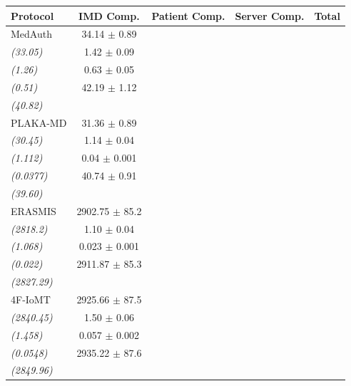 \begin{tabular}{l|c|c|c|c}
\toprule
\textbf{Protocol} & \textbf{IMD Comp.} & \textbf{Patient Comp.} & \textbf{Server Comp.} & \textbf{Total} \\
\midrule
MedAuth & 34.14 $\pm$ 0.89 \\ \textit{(33.05)} & 1.42 $\pm$ 0.09 \\ \textit{(1.26)} & 0.63 $\pm$ 0.05 \\ \textit{(0.51)} & 42.19 $\pm$ 1.12 \\ \textit{(40.82)} \\
PLAKA-MD & 31.36 $\pm$ 0.89 \\ \textit{(30.45)} & 1.14 $\pm$ 0.04 \\ \textit{(1.112)} & 0.04 $\pm$ 0.001 \\ \textit{(0.0377)} & 40.74 $\pm$ 0.91 \\ \textit{(39.60)} \\
ERASMIS & 2902.75 $\pm$ 85.2 \\ \textit{(2818.2)} & 1.10 $\pm$ 0.04 \\ \textit{(1.068)} & 0.023 $\pm$ 0.001 \\ \textit{(0.022)} & 2911.87 $\pm$ 85.3 \\ \textit{(2827.29)} \\
4F-IoMT & 2925.66 $\pm$ 87.5 \\ \textit{(2840.45)} & 1.50 $\pm$ 0.06 \\ \textit{(1.458)} & 0.057 $\pm$ 0.002 \\ \textit{(0.0548)} & 2935.22 $\pm$ 87.6 \\ \textit{(2849.96)} \\
\bottomrule
\end{tabular}
